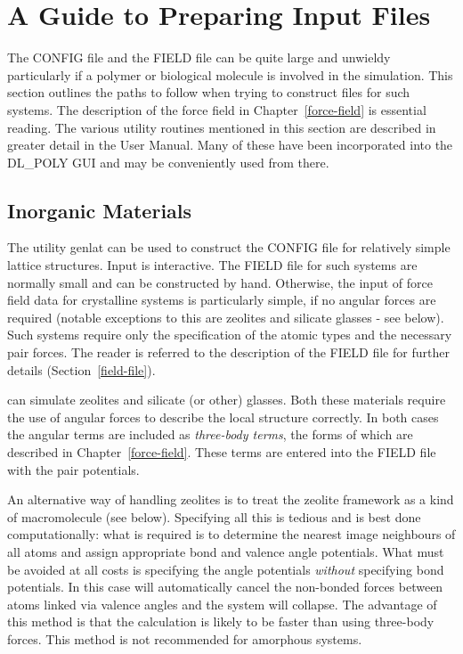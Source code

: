 \section{A Guide to Preparing Input Files}

The CONFIG file and the FIELD file can be quite large and unwieldy
particularly if a polymer or biological molecule is involved in the
simulation.  This section outlines the paths to follow when trying
to construct files for such systems.  The description of the \D
force field in Chapter~\ref{force-field} is essential reading.  The
various utility routines mentioned in this section are described in
greater detail in the \C User Manual.  Many of these have been
incorporated into the DL\_POLY GUI \cite{smith-gui} and may
be conveniently used from there.

\subsection {Inorganic Materials}

The utility {\sc genlat} can be used to construct the CONFIG file
for relatively simple lattice structures.  Input is interactive. The
FIELD file for such systems are normally small and can be
constructed by hand.  Otherwise, the input of force field data for
crystalline systems is particularly simple, if no angular forces are
required (notable exceptions to this are zeolites and silicate
glasses - see below).  Such systems require only the specification
of the atomic types and the necessary pair forces.  The reader is
referred to the description of the \D FIELD file for further details
(Section~\ref{field-file}).

\D can simulate zeolites and silicate (or other) glasses.  Both
these materials require the use of angular forces to describe the
local structure correctly.  In both cases the angular terms are
included as {\em three-body terms}, the forms of which are described
in Chapter~\ref{force-field}.  These terms are entered into the
FIELD file with the pair potentials.

An alternative way of handling zeolites is to treat the zeolite
framework as a kind of macromolecule (see below).  Specifying all
this is tedious and is best done computationally: what is required
is to determine the nearest image neighbours of all atoms and assign
appropriate bond and valence angle potentials.  What must be avoided
at all costs is specifying the angle potentials {\em without}
specifying bond potentials.  In this case \D
will automatically cancel the non-bonded
forces between atoms linked via valence
angles and the system will collapse.
The advantage of this method is that the calculation is likely to be
faster than using three-body forces.
This method is not recommended for amorphous systems.

